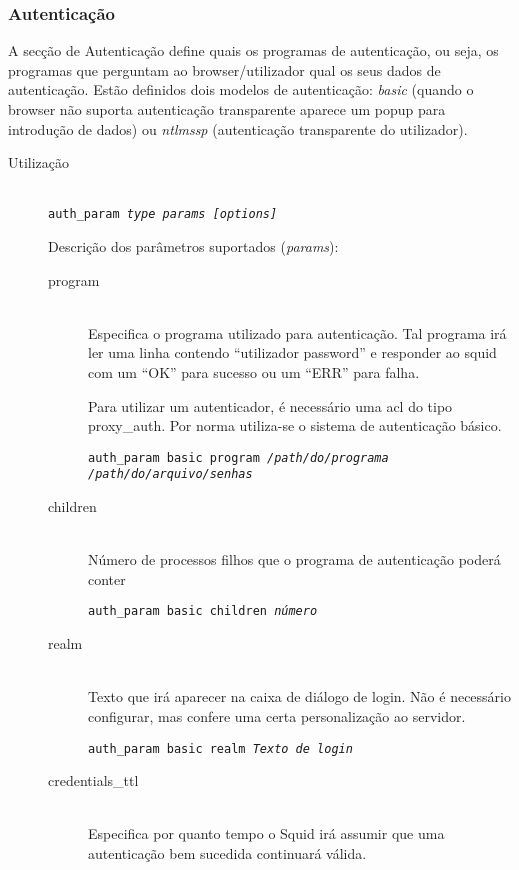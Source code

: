 \subsubsection{Autenticação}

A secção de Autenticação define quais os programas de
autenticação, ou seja, os programas que perguntam ao
browser/utilizador qual os seus dados de autenticação.
Estão definidos dois modelos de autenticação: \emph{basic}
(quando o browser não suporta autenticação transparente
aparece um popup para introdução de dados) ou \emph{ntlmssp}
(autenticação transparente do utilizador).


\begin{description}
\item[Utilização]~\\
\texttt{auth\_param \emph{type} \emph{params} \emph{[options]}}

Descrição dos parâmetros suportados (\emph{params}):

\begin{description}
\item[program]~\\
Especifica o programa utilizado para autenticação.  
Tal programa irá ler uma linha contendo ``utilizador password''
e responder ao squid com um ``OK'' para sucesso ou um ``ERR''
para falha.

Para utilizar um autenticador, é necessário uma acl do
tipo proxy\_auth.  
Por norma utiliza-se o sistema de autenticação básico.

\texttt{auth\_param basic program \emph{/path/do/programa}
\emph{/path/do/arquivo/senhas}}

\item[children]~\\
Número de processos filhos que o programa de autenticação
poderá conter

\texttt{auth\_param basic children \emph{número}}

\item[realm]~\\
Texto que irá aparecer na caixa de diálogo de login. Não é
necessário configurar, mas confere uma certa personalização ao
servidor.

\texttt{auth\_param basic realm \emph{Texto de login}}

\item[credentials\_ttl]~\\
Especifica por quanto tempo o Squid irá assumir que uma
autenticação bem sucedida continuará válida.


\end{description}
\end{description}
